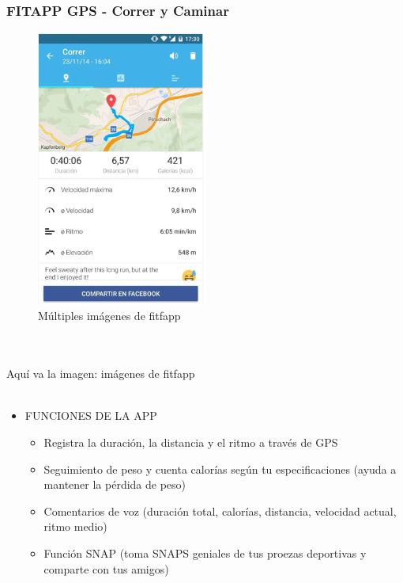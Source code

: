\documentclass[a4paper, 11pt]{article}
\begin{document}
          \subsubsection{FITAPP GPS - Correr y Caminar}
              \begin{figure}[H]
                  \centering
                    \includegraphics[width=0.5\textwidth]{fitfapp}
                    \caption{Múltiples imágenes de fitfapp}
                    \label{f:fitfapp}
                \end{figure}
                \\\\\textcolor[rgb]{1,0,0}{Aquí va la imagen: imágenes de fitfapp}\\\\
                  \begin{itemize}
                    \item{FUNCIONES DE LA APP}
                    \begin{itemize}
                      \item {Registra la duración, la distancia y el ritmo a través de GPS}
                      \item {Seguimiento de peso y cuenta calorías según tu especificaciones (ayuda a mantener la pérdida de peso)}
                      \item {Comentarios de voz (duración total, calorías, distancia, velocidad actual, ritmo medio)}
                      \item {Función SNAP (toma SNAPS geniales de tus proezas deportivas y comparte con tus amigos)}
                    \end{itemize}
                  \end{itemize}
\end{document}
